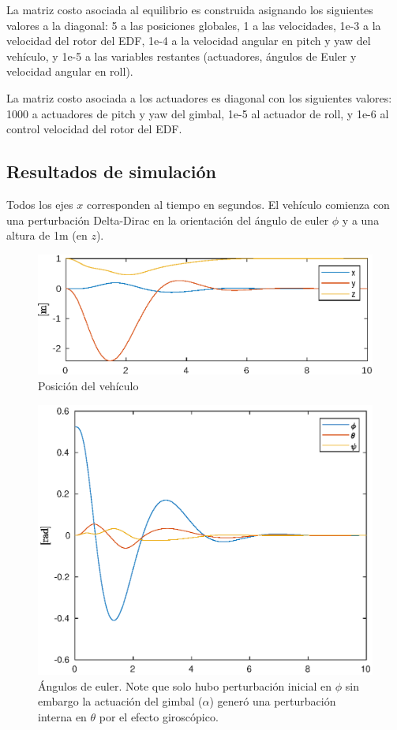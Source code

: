 La matriz costo asociada al equilibrio es construida asignando los siguientes valores a la diagonal: 5 a las posiciones globales, 1 a las velocidades, 1e-3 a la velocidad del rotor del EDF, 1e-4 a la velocidad angular en pitch y yaw del vehículo, y 1e-5 a las variables restantes (actuadores, ángulos de Euler y velocidad angular en roll).

\medskip

La matriz costo asociada a los actuadores es diagonal con los siguientes valores: 1000 a actuadores de pitch y yaw del gimbal, 1e-5 al actuador de roll, y 1e-6 al control velocidad del rotor del EDF.


\subsection{Resultados de simulación}

Todos los ejes $x$ corresponden al tiempo en segundos. El vehículo comienza con una perturbación Delta-Dirac en la orientación del ángulo de euler $\phi$ y a una altura de 1m (en $z$).

\begin{figure}[!ht]
    \centering
    \includegraphics[width=0.8\linewidth]{fig/pos_edf}
    \caption{Posición del vehículo}
    \label{fig:pos_edf}
\end{figure}

\begin{figure}[!ht]
    \centering
    \includegraphics[width=0.6\linewidth]{fig/eulerang_edf}
    \caption{Ángulos de euler. Note que solo hubo perturbación inicial en $\phi$ sin embargo la actuación del gimbal ($\alpha$) generó una perturbación interna en $\theta$ por el efecto giroscópico.}
    \label{fig:eulerang_edf}
\end{figure}

